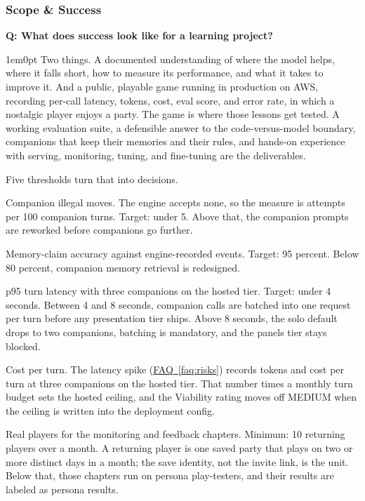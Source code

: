 \documentclass[11pt,letterpaper]{article}
\newcounter{faqnum}
\newenvironment{faqpair}[1]{%
  \needspace{4\baselineskip}\vspace{0.5em}\refstepcounter{faqnum}%
  \noindent\textbf{\color{SectionBlue}Q\thefaqnum: #1}\par\nopagebreak[4]%
  \vspace{0.2em}\begin{adjustwidth}{1em}{0pt}\setlength{\parindent}{0pt}%
}{\end{adjustwidth}\vspace{0.5em}}
\newcommand{\faqref}[1]{\hyperref[#1]{FAQ~\ref*{#1}}}
\begin{document}
\subsubsection*{Scope \& Success}

\begin{faqpair}{What does success look like for a learning project?}\label{faq:success}
Two things. A documented understanding of where the model helps, where it
falls short, how to measure its performance, and what it takes to improve
it. And a public, playable game running in production on AWS, recording
per-call latency, tokens, cost, eval score, and error rate, in which a
nostalgic player enjoys a party. The game is where those lessons get
tested. A working evaluation suite, a defensible answer to the
code-versus-model boundary, companions that keep their memories and their
rules, and hands-on experience with serving, monitoring, tuning, and
fine-tuning are the deliverables.

Five thresholds turn that into decisions.

Companion illegal moves. The engine accepts none, so the measure is
attempts per 100 companion turns. Target: under 5. Above that, the
companion prompts are reworked before companions go further.

Memory-claim accuracy against engine-recorded events. Target: 95 percent.
Below 80 percent, companion memory retrieval is redesigned.

p95 turn latency with three companions on the hosted tier. Target: under 4
seconds. Between 4 and 8 seconds, companion calls are batched into one
request per turn before any presentation tier ships. Above 8 seconds, the
solo default drops to two companions, batching is mandatory, and the
panels tier stays blocked.

Cost per turn. The latency spike (\faqref{faq:risks}) records tokens and
cost per turn at three companions on the hosted tier. That number times a monthly turn budget sets
the hosted ceiling, and the Viability rating moves off MEDIUM when the
ceiling is written into the deployment config.

Real players for the monitoring and feedback chapters. Minimum: 10
returning players over a month. A returning player is one saved party that
plays on two or more distinct days in a month; the save identity, not the
invite link, is the unit. Below that, those chapters run on persona
play-testers, and their results are labeled as persona results.
\end{faqpair}
\end{document}

